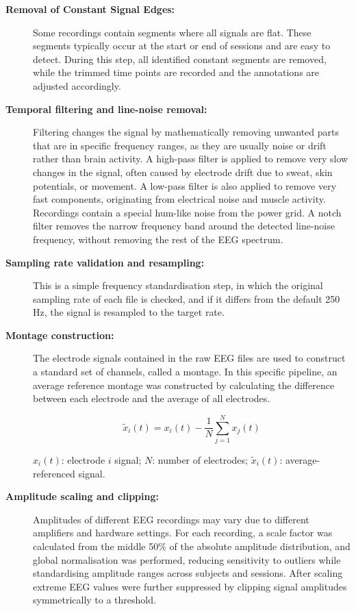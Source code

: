 \begin{description}

\item[\textbf{Removal of Constant Signal Edges:}] Some recordings contain segments where all signals are flat. These segments typically occur at the start or end of sessions and are easy to detect. During this step, all identified constant segments are removed, while the trimmed time points are recorded and the annotations are adjusted accordingly.

\item[\textbf{Temporal filtering and line-noise removal:}] Filtering changes the signal by mathematically removing unwanted parts that are in specific frequency ranges, as they are usually noise or drift rather than brain activity. A high-pass filter is applied to remove very slow changes in the signal, often caused by electrode drift due to sweat, skin potentials, or movement. A low-pass filter is also applied to remove very fast components, originating from electrical noise and muscle activity. Recordings contain a special hum-like noise from the power grid. A notch filter removes the narrow frequency band around the detected line-noise frequency, without removing the rest of the EEG spectrum.

\item[\textbf{Sampling rate validation and resampling:}] This is a simple frequency standardisation step, in which the original sampling rate of each file is checked, and if it differs from the default 250 Hz, the signal is resampled to the target rate.

\item[\textbf{Montage construction:}] The electrode signals contained in the raw EEG files are used to construct a standard set of channels, called a montage. In this specific pipeline, an average reference montage was constructed by calculating the difference between each electrode and the average of all electrodes.

\[
\tilde{x}_i(t) = x_i(t) - \frac{1}{N} \sum_{j=1}^{N} x_j(t)
\]

$x_i(t)$: electrode $i$ signal; $N$: number of electrodes; $\tilde{x}_i(t)$: average-referenced signal.

\item[\textbf{Amplitude scaling and clipping:}] Amplitudes of different EEG recordings may vary due to different amplifiers and hardware settings. For each recording, a scale factor was calculated from the middle 50\% of the absolute amplitude distribution, and global normalisation was performed, reducing sensitivity to outliers while standardising amplitude ranges across subjects and sessions. After scaling extreme EEG values were further suppressed by clipping signal amplitudes symmetrically to a threshold.


\end{description}
